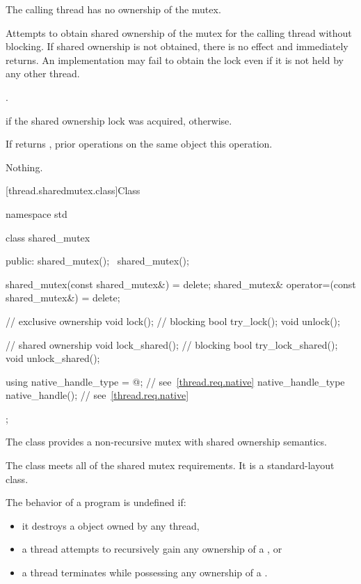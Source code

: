 \begin{itemdescr}
\pnum
\expects
The calling thread has no ownership of the mutex.

\pnum
\effects
Attempts to obtain shared ownership of the mutex for the calling
thread without blocking. If shared ownership is not obtained, there is no
effect and  immediately returns. An implementation
may fail to obtain the lock even if it is not held by any other thread.

\pnum
\returntype {}.

\pnum
\returns
{} if the shared ownership lock was acquired, 
otherwise.

\pnum
\sync
If  returns , prior 
operations on the same object  this
operation.

\pnum
\throws
Nothing.
\end{itemdescr}

[thread.sharedmutex.class]{Class }

%
\begin{codeblock}
namespace std {
  class shared_mutex {
  public:
    shared_mutex();
    ~shared_mutex();

    shared_mutex(const shared_mutex&) = delete;
    shared_mutex& operator=(const shared_mutex&) = delete;

    // exclusive ownership
    void lock();                // blocking
    bool try_lock();
    void unlock();

    // shared ownership
    void lock_shared();         // blocking
    bool try_lock_shared();
    void unlock_shared();

    using native_handle_type = @\impdefnc@;          // see~\ref{thread.req.native}
    native_handle_type native_handle();                         // see~\ref{thread.req.native}
  };
}
\end{codeblock}

\pnum
The class  provides a non-recursive mutex
with shared ownership semantics.

\pnum
The class  meets
all of the shared mutex requirements.
It is a standard-layout class.

\pnum
The behavior of a program is undefined if:
\begin{itemize}
\item it destroys a  object owned by any thread,
\item a thread attempts to recursively gain any ownership of a , or
\item a thread terminates while possessing any ownership of a .
\end{itemize}

